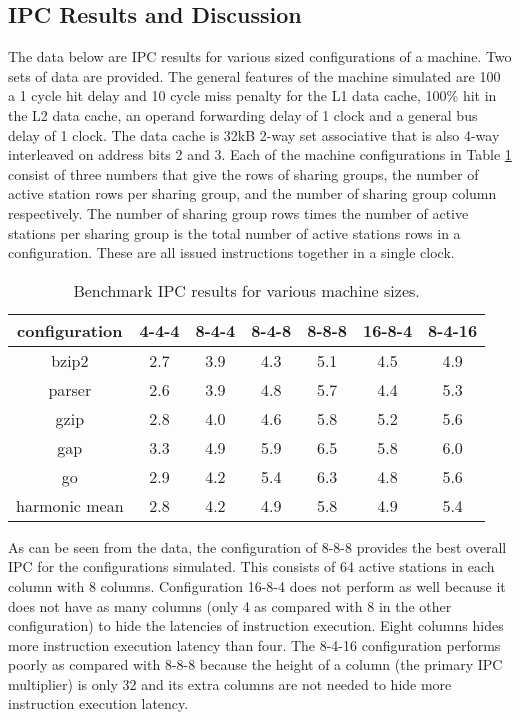 \documentclass[10pt,dvips]{article}
\begin{document}
\subsection{IPC Results and Discussion}
The data below are IPC results for various sized configurations of
a machine.  Two sets of data are provided.  The general features of
the machine simulated are 100%
a 1 cycle hit delay and 10 cycle miss penalty for the L1 data cache,
100\% hit in the L2 data cache, an operand forwarding delay of 1 clock
and a general bus delay of 1 clock.  The data cache is 32kB 2-way
set associative that is also 4-way interleaved on address bits 2 and 3.
Each of the machine configurations in Table \ref{tab:ipc} consist of three
numbers that give the rows of sharing groups, the number
of active station rows per sharing group, and the number of sharing
group column respectively.  The number of sharing group rows times the
number of active stations per sharing group is the total number of
active stations rows in a configuration.  These are all issued instructions
together in a single clock.

\makeatletter
\providecommand{\LyX}{L\kern-.1667em\lower.25em\hbox{Y}\kern-.125emX\@}
\makeatother

\begin{table}
\begin{center}
\caption{Benchmark IPC results for various machine sizes.}\label{tab:ipc}
\begin{tabular}{|c|c|c|c|c|c|c|}
\hline 
configuration&
4-4-4&
8-4-4&
8-4-8&
8-8-8&
16-8-4&
8-4-16\\
\hline
\hline 
bzip2&
2.7&
3.9&
4.3&
5.1&
4.5&
4.9\\
\hline 
parser&
2.6&
3.9&
4.8&
5.7&
4.4&
5.3\\
\hline 
gzip&
2.8&
4.0&
4.6&
5.8&
5.2&
5.6\\
\hline 
gap&
3.3&
4.9&
5.9&
6.5&
5.8&
6.0\\
\hline 
go&
2.9&
4.2&
5.4&
6.3&
4.8&
5.6\\
\hline 
harmonic mean&
2.8&
4.2&
4.9&
5.8&
4.9&
5.4\\
\hline
\end{tabular}
\end{center}
\end{table}

As can be seen from the data, the configuration of 8-8-8 provides
the best overall IPC for the configurations simulated.  This consists
of 64 active stations in each column with 8 columns.
Configuration 16-8-4 does not perform as well because it does not
have as many columns (only 4 as compared with 8 in the other configuration)
to hide the latencies of instruction execution.  Eight columns 
hides more instruction execution latency than four.  The 8-4-16
configuration performs poorly as compared with 8-8-8 because the height
of a column (the primary IPC multiplier) is only 32 and its extra
columns are not needed to hide more instruction execution latency.
\end{document}
